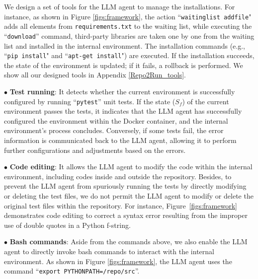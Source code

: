 We design a set of tools for the LLM agent to manage the installations. For instance, as shown in Figure \ref{figs:framework}, the action ``\texttt{waitinglist addfile}" adds all elements from \texttt{requirements.txt} to the waiting list, while executing the ``\texttt{download}'' command, third-party libraries are taken one by one from the waiting list and installed in the internal environment. The installation commands (e.g., ``\texttt{pip install}" and ``\texttt{apt-get install}") are executed. If the installation succeeds, the state of the environment is updated; if it fails, a rollback is performed. We show all our designed tools in Appendix \ref{Repo2Run_tools}.

$\bullet$ \textbf{Test running}:
It detects whether the current environment is successfully configured by running ``\texttt{pytest}'' unit tests. If the state ($S_f$) of the current environment passes the tests, it indicates that the LLM agent has successfully configured the environment within the Docker container, and the internal environment's process concludes. Conversely, if some tests fail, the error information is communicated back to the LLM agent, allowing it to perform further configurations and adjustments based on the errors.

$\bullet$ \textbf{Code editing}:
It allows the LLM agent to modify the code within the internal environment, including codes inside and outside the repository. Besides, to prevent the LLM agent from spuriously running the tests by directly modifying or deleting the test files, we do not permit the LLM agent to modify or delete the original test files within the repository.
For instance, Figure~\ref{figs:framework} demonstrates code editing to correct a syntax error resulting from the improper use of double quotes in a Python f-string.

$\bullet$ \textbf{Bash commands}:
Aside from the commands above, we also enable the LLM agent to directly invoke bash commands to interact with the internal environment. As shown in Figure \ref{figs:framework}, the LLM agent uses the command ``\texttt{export PYTHONPATH=/repo/src}''.

